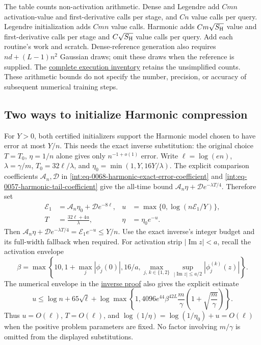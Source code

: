 The table counts non-activation arithmetic. Dense and Legendre add $Cmn$
activation-value and first-derivative calls per stage, and $Cn$ value calls
per query. Legendre initialization adds $Cmn$ value calls. Harmonic adds
$Cm\sqrt{S_{\rm H}}$ value and first-derivative calls per stage and
$C\sqrt{S_{\rm H}}$ value calls per query. Add each routine's work and
scratch. Dense-reference generation also requires $nd+(L-1)n^2$ Gaussian
draws; omit these draws when the reference is supplied. The
\hyperref[int:computational-costs]{complete execution inventory}
retains the unsimplified counts. These arithmetic bounds do not specify
the number, precision, or accuracy of subsequent numerical training steps.

\subsection{Two ways to initialize Harmonic compression}

For $Y>0$, both certified initializers support the Harmonic model chosen to have
error at most $Y/n$. This needs the exact inverse substitution: the
original choice $T=T_0$, $\eta=1/n$ alone gives only
$n^{-1+o(1)}$ error. Write $\ell=\log(en)$,
$\lambda=\gamma/m$, $T_0=32\ell/\lambda$, and
$\eta_0=\min(1,Y,16Y/\lambda)$. The explicit comparison coefficients
$\mathcal A_n,\mathcal D$ in
\eqref{int:eq-0068-harmonic-exact-error-coefficient} and
\eqref{int:eq-0057-harmonic-tail-coefficient} give the all-time bound
$\mathcal A_n\eta+\mathcal D e^{-\lambda T/4}$. Therefore set
\begin{align}
 \mathcal E_1&=\mathcal A_n\eta_0+\mathcal D e^{-8\ell},
 &u&=\max\{0,\log(n\mathcal E_1/Y)\},\nonumber\\
 T&=\frac{32\ell+4u}{\lambda},
 &\eta&=\eta_0e^{-u}.
 \label{eq:harmonic-setup-exact-target}
\end{align}
Then $\mathcal A_n\eta+\mathcal D e^{-\lambda T/4}
=\mathcal E_1e^{-u}\le Y/n$. Use the exact inverse's integer
budget and its full-width fallback when required. For activation strip
$|\operatorname{Im}z|<a$, recall the activation envelope
\[
 \beta=\max\left\{10,1+\max_j|\phi_j(0)|,16/a,
 \max_{j,\,k\in\{1,2\}}\sup_{|\operatorname{Im}z|\le a/2}
 |\phi_j^{(k)}(z)|\right\}.
\]
The numerical envelope
in the \hyperref[int:harmonic-budget-inversion-proof]{inverse proof}
also gives the explicit estimate
\begin{equation}
 u\le\log n+65\sqrt\ell+
 \log\max\!\left\{1,4096e^{44}\beta^{42L}
 \frac m\gamma\left(1+\sqrt{\frac m\gamma}\right)\right\}.
 \label{eq:harmonic-setup-target-overhead}
\end{equation}
Thus $u=O(\ell)$, $T=O(\ell)$, and
$\log(1/\eta)=\log(1/\eta_0)+u=O(\ell)$ when the positive problem
parameters are fixed. No factor involving $m/\gamma$ is omitted from
the displayed substitutions.

